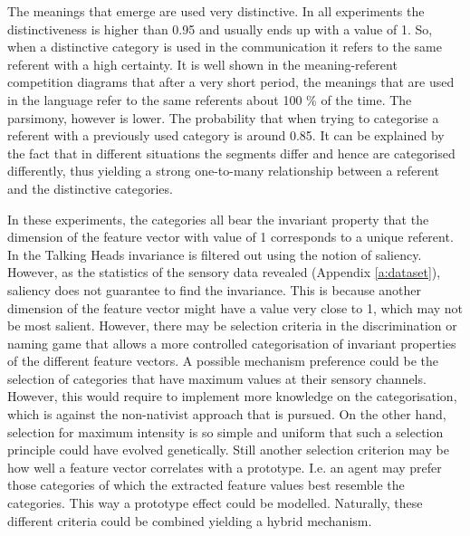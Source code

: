 The meanings that emerge are used very distinctive. In all experiments the distinctiveness is higher than 0.95 and usually ends up with a value of 1. So, when a distinctive category is used in the communication it refers to the same referent with a high certainty. It is well shown in the meaning-referent competition diagrams that after a very short period, the meanings that are used in the language refer to the same referents about 100 \% of the time. The parsimony, however is lower. The probability that when trying to categorise a referent with a previously used category is around 0.85. It can be explained by the fact that in different situations the segments differ and hence are categorised differently, thus yielding a strong one-to-many relationship between a referent and the distinctive categories.

In these experiments, the categories all bear the invariant property that the dimension of the feature vector with value of 1 corresponds to a unique referent. In the Talking Heads invariance is filtered out using the notion of saliency. However, as the statistics of the sensory data revealed (Appendix \ref{a:dataset}), saliency does not guarantee to find the invariance. This is because another dimension of the feature vector might have a value very close to 1, which may not be most salient. However, there may be selection criteria in the discrimination or naming game that allows a more controlled categorisation of invariant properties of the different feature vectors. A possible mechanism preference could be the selection of categories that have maximum values at their sensory channels. However, this would require to implement more knowledge on the categorisation, which is against the non-nativist approach that is pursued. On the other hand, selection for maximum intensity is so simple and uniform that such a selection principle could have evolved genetically. Still another selection criterion may be how well a feature vector correlates with a prototype. I.e. an agent may prefer those categories of which the extracted feature values best resemble the categories. This way a prototype effect \citep{rosch:1976} could be modelled. Naturally, these different criteria could be combined yielding a hybrid mechanism.  



